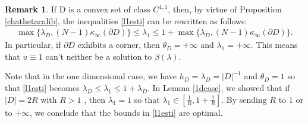 \documentclass[reqno,11pt]{amsart}
\theoremstyle{definition}
\newtheorem{remark}[theorem]{Remark}
\numberwithin{equation}{section}
\newcommand{\1}{{{\bf 1}\kern-0,28em\rm l}}
\def\l{\lambda}
\begin{document}
\begin{remark}\label{convexD} If D is a convex set of class $C^{1,1}$, then, by virtue of Proposition \ref{chathetacalib}, the inequalities \eqref{l1esti} can be rewritten as follows:\begin{align}
\max \{\lambda_D, (N-1)\kappa_\infty(\partial D)\} \le  \lambda_1 \le 1+ \max \{\lambda_D, (N-1)\kappa_\infty(\partial D)\}. \label{l1estim}
\end{align}
In particular, if  $\partial D$ exhibits a corner, then $\theta_D=+\infty$  and $\lambda_1=+\infty$. This means that  $u\equiv 1$ can't neither be a solution to  $\beta(\lambda)$.

Note that in the one dimensional case, we have $h_D=\l_D = |D|^{-1}$ and $\theta_D=1$ so that \eqref{l1esti} becomes $\l_D\le \l_1\le 1+\l_D$. 
In Lemma \ref{1dcase}, we showed that if $|D|=2R$ with $R>1$ , then $\l_1=1$ so that $\l_1 \in [\frac1{R}, 1 + \frac1{R}]$. By sending $R$ to $1$ or to $+\infty$,
we conclude that the bounds in \eqref {l1esti} are optimal. 
\end{remark}




\end{document}

